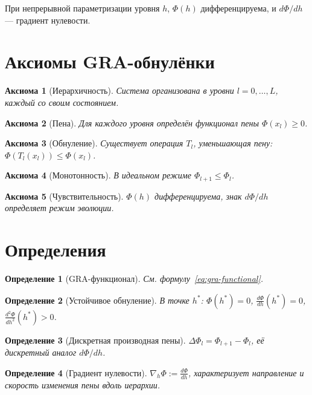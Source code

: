 \documentclass[11pt,a4paper]{article}
\newtheorem{axiom}{Аксиома}
\newtheorem{definition}{Определение}
\begin{document}
При непрерывной параметризации уровня $h$, $\Phi(h)$ дифференцируема, и $d\Phi/dh$ --- градиент нулевости.

\section{Аксиомы GRA-обнулёнки}

\begin{axiom}[Иерархичность]
Система организована в уровни $l = 0,\dots,L$, каждый со своим состоянием.
\end{axiom}

\begin{axiom}[Пена]
Для каждого уровня определён функционал пены $\Phi(x_l) \geq 0$.
\end{axiom}

\begin{axiom}[Обнуление]
Существует операция $T_l$, уменьшающая пену: $\Phi(T_l(x_l)) \leq \Phi(x_l)$.
\end{axiom}

\begin{axiom}[Монотонность]
В идеальном режиме $\Phi_{l+1} \leq \Phi_l$.
\end{axiom}

\begin{axiom}[Чувствительность]
$\Phi(h)$ дифференцируема, знак $d\Phi/dh$ определяет режим эволюции.
\end{axiom}

\section{Определения}

\begin{definition}[GRA-функционал]
См. формулу~\ref{eq:gra-functional}.
\end{definition}

\begin{definition}[Устойчивое обнуление]
В точке $h^*$: $\Phi(h^*) = 0$, $\frac{d\Phi}{dh}(h^*) = 0$, $\frac{d^2\Phi}{dh^2}(h^*) > 0$.
\end{definition}

\begin{definition}[Дискретная производная пены]
$\Delta\Phi_l = \Phi_{l+1} - \Phi_l$, её дискретный аналог $d\Phi/dh$.
\end{definition}

\begin{definition}[Градиент нулевости]
$\nabla_h \Phi := \frac{d\Phi}{dh}$, характеризует направление и скорость изменения пены вдоль иерархии.
\end{definition}
\end{document}
